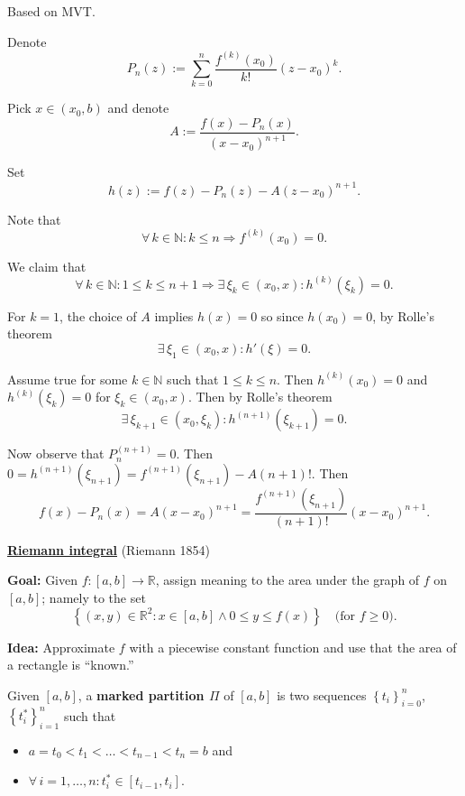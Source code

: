\documentclass{notes}
\begin{document}
  \begin{prf}
    Based on MVT.
    
    Denote
    \[
      P_n(z) := \sum_{k = 0}^n \frac{f^{(k)}(x_0)}{k!} (z - x_0)^k.
    \]
    

    Pick $x \in (x_0, b)$ and denote 
    \[
      A := \frac{f(x) - P_n(x)}{(x - x_0)^{n + 1}}.
    \]
    
    Set 
    \[
      h(z) := f(z) - P_n(z) - A(z - x_0)^{n + 1}.
    \]
    
    Note that 
    \[
      \forall \, k \in \mathbb N: k \leq n \Rightarrow f^{(k)}(x_0) = 0.
    \]
    
    We claim that 
    \[
      \forall \, k \in \mathbb N: 1 \leq k \leq n + 1 \Rightarrow \exists \, \xi_k \in (x_0, x): h^{(k)}(\xi_k) = 0.
    \]
    
    For $k = 1$, the choice of $A$ implies $h(x) = 0$ so since $h(x_0) = 0$, by Rolle's theorem
    \[
      \exists \, \xi_1 \in (x_0, x): h'(\xi) = 0.
    \]
    
    Assume true for some $k \in \mathbb N$ such that $1 \leq k \leq n$.
    Then $h^{(k)}(x_0) = 0$ and $h^{(k)}(\xi_k) = 0$ for $\xi_k \in (x_0, x)$.
    Then by Rolle's theorem 
    \[
      \exists \, \xi_{k + 1} \in (x_0, \xi_k): h^{(n + 1)}(\xi_{k + 1}) = 0.
    \]
    
    Now observe that $P_n^{(n + 1)} = 0$.
    Then $0 = h^{(n + 1)}(\xi_{n + 1}) = f^{(n + 1)}(\xi_{n + 1}) - A (n + 1)!$.
    Then 
    \[
      f(x) - P_n(x) = A(x - x_0)^{n + 1} = \frac{f^{(n + 1)}(\xi_{n + 1})}{(n + 1)!} (x - x_0)^{n + 1}.
    \]
  \end{prf}
  
  {\boldmath \bfseries \underline{Riemann integral}} (Riemann 1854)
  
  {\boldmath \bfseries Goal:} Given $f \colon [a, b] \to \mathbb R$, assign meaning to the area under the graph of $f$ on $[a, b]$; namely to the set 
  \[
    \left \{ (x, y) \in \mathbb R^2 : x \in [a, b] \land 0 \leq y \leq f(x) \right \} \quad \text{(for $f \geq 0$)}.
  \]
  
  {\boldmath \bfseries Idea:} Approximate $f$ with a piecewise constant function and use that the area of a rectangle is ``known.''
  
  \begin{defn}
    Given $[a, b]$, a {\boldmath \bfseries marked partition $\Pi$} of $[a, b]$ is two sequences $\left \{ t_i \right \}_{i = 0}^n$, $\left \{ t^*_i \right \}_{i = 1}^n$ such that 
    \begin{itemize}
      \item $a = t_0 < t_1 < \dots < t_{n - 1} < t_n = b$ and 

      \item $\forall \, i = 1, \dots, n: t^*_i \in [t_{i - 1}, t_i]$.
    \end{itemize}
  \end{defn}
  
\end{document}

